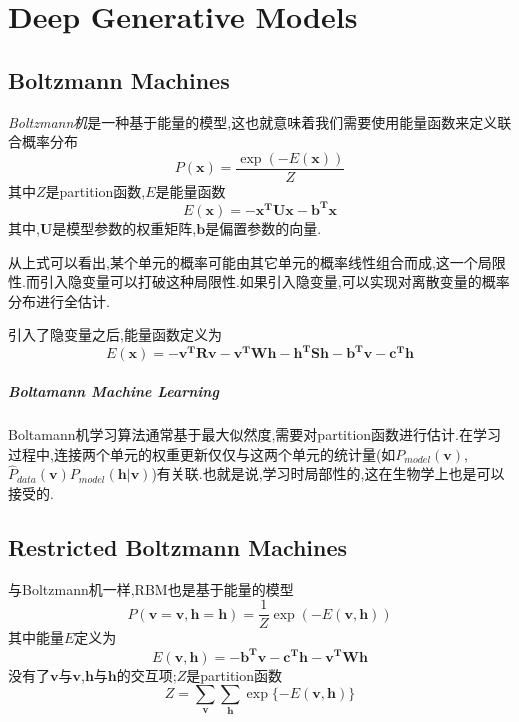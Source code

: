 \chapter{Deep Generative Models}

\section{Boltzmann Machines}

\textit{Boltzmann机}是一种基于能量的模型,这也就意味着我们需要使用能量函数来定义联合概率分布
\begin{equation}
P(\bm x)=\frac{\exp(-E(\bm x))}{Z}
\end{equation}
其中$Z$是partition函数,$E$是能量函数
\begin{equation}
E(\bm x)=\bm{-x^TUx-b^Tx}
\end{equation}
其中,$\bm U$是模型参数的权重矩阵,$\bm b$是偏置参数的向量.

从上式可以看出,某个单元的概率可能由其它单元的概率线性组合而成,这一个局限性.而引入隐变量可以打破这种局限性.如果引入隐变量,可以实现对离散变量的概率分布进行全估计.

引入了隐变量之后,能量函数定义为
\begin{equation}
E(\bm x)=\bm{-v^TRv-v^TWh-h^TSh-b^Tv-c^Th}
\end{equation}

\paragraph{Boltamann Machine Learning} Boltamann机学习算法通常基于最大似然度,需要对partition函数进行估计.在学习过程中,连接两个单元的权重更新仅仅与这两个单元的统计量(如$P_{model}(\bm v)$,$\hat P_{data}(\bm v)P_{model}(\bm{h|v})$)有关联.也就是说,学习时局部性的,这在生物学上也是可以接受的.

\section{Restricted Boltzmann Machines}

与Boltzmann机一样,RBM也是基于能量的模型
\begin{equation}
P(\mathbf v=\bm v,\mathbf h=\bm h)=\frac{1}{Z}\exp(-E(\bm{v,h}))
\end{equation}
其中能量$E$定义为
\begin{equation}\label{eq:rbm_energy}
E(\bm{v,h})=\bm{-b^Tv-c^Th-v^TWh}
\end{equation}
没有了$\bm v$与$\bm v$,$\bm h$与$\bm h$的交互项;$Z$是partition函数
\begin{equation}
Z=\sum_{\bm v}\sum_{\bm h}\exp\{-E(\bm{v,h})\}
\end{equation}

